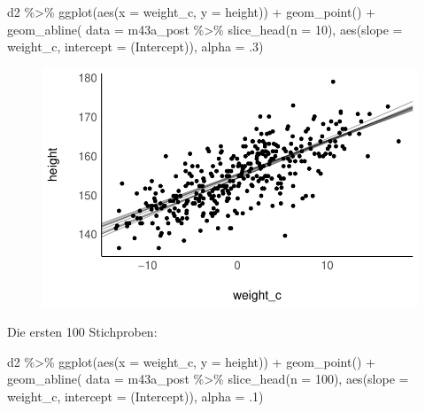 \documentclass[
  a4paper,
  DIV=11]{scrreprt}
\newenvironment{Shaded}{\begin{snugshade}}{\end{snugshade}}
\newcommand{\AttributeTok}[1]{\textcolor[rgb]{0.40,0.45,0.13}{#1}}
\newcommand{\DecValTok}[1]{\textcolor[rgb]{0.68,0.00,0.00}{#1}}
\newcommand{\FunctionTok}[1]{\textcolor[rgb]{0.28,0.35,0.67}{#1}}
\newcommand{\NormalTok}[1]{\textcolor[rgb]{0.00,0.23,0.31}{#1}}
\newcommand{\SpecialCharTok}[1]{\textcolor[rgb]{0.37,0.37,0.37}{#1}}
\newcommand{\StringTok}[1]{\textcolor[rgb]{0.13,0.47,0.30}{#1}}
\theoremstyle{definition}
\theoremstyle{remark}
\begin{document}
\begin{Shaded}
\begin{Highlighting}[]
\NormalTok{d2 }\SpecialCharTok{\%\textgreater{}\%} 
  \FunctionTok{ggplot}\NormalTok{(}\FunctionTok{aes}\NormalTok{(}\AttributeTok{x =}\NormalTok{ weight\_c, }
             \AttributeTok{y =}\NormalTok{ height)) }\SpecialCharTok{+}
  \FunctionTok{geom\_point}\NormalTok{() }\SpecialCharTok{+}
  \FunctionTok{geom\_abline}\NormalTok{(}
    \AttributeTok{data =}\NormalTok{ m43a\_post }\SpecialCharTok{\%\textgreater{}\%} 
      \FunctionTok{slice\_head}\NormalTok{(}\AttributeTok{n =} \DecValTok{10}\NormalTok{),}
    \FunctionTok{aes}\NormalTok{(}\AttributeTok{slope =}\NormalTok{ weight\_c,}
        \AttributeTok{intercept =} \StringTok{\textasciigrave{}}\AttributeTok{(Intercept)}\StringTok{\textasciigrave{}}\NormalTok{),}
    \AttributeTok{alpha =}\NormalTok{ .}\DecValTok{3}\NormalTok{)}
\end{Highlighting}
\end{Shaded}

\begin{figure}[H]

{\centering \includegraphics{./lineare-modelle_files/figure-pdf/Post-Regression-befragen-10-1.pdf}

}

\end{figure}

Die ersten 100 Stichproben:

\begin{Shaded}
\begin{Highlighting}[]
\NormalTok{d2 }\SpecialCharTok{\%\textgreater{}\%} 
  \FunctionTok{ggplot}\NormalTok{(}\FunctionTok{aes}\NormalTok{(}\AttributeTok{x =}\NormalTok{ weight\_c, }
             \AttributeTok{y =}\NormalTok{ height)) }\SpecialCharTok{+}
  \FunctionTok{geom\_point}\NormalTok{() }\SpecialCharTok{+}
  \FunctionTok{geom\_abline}\NormalTok{(}
    \AttributeTok{data =}\NormalTok{ m43a\_post }\SpecialCharTok{\%\textgreater{}\%} 
      \FunctionTok{slice\_head}\NormalTok{(}\AttributeTok{n =} \DecValTok{100}\NormalTok{),}
     \FunctionTok{aes}\NormalTok{(}\AttributeTok{slope =}\NormalTok{ weight\_c,}
        \AttributeTok{intercept =} \StringTok{\textasciigrave{}}\AttributeTok{(Intercept)}\StringTok{\textasciigrave{}}\NormalTok{),}
    \AttributeTok{alpha =}\NormalTok{ .}\DecValTok{1}\NormalTok{)}
\end{Highlighting}
\end{Shaded}
\end{document}
